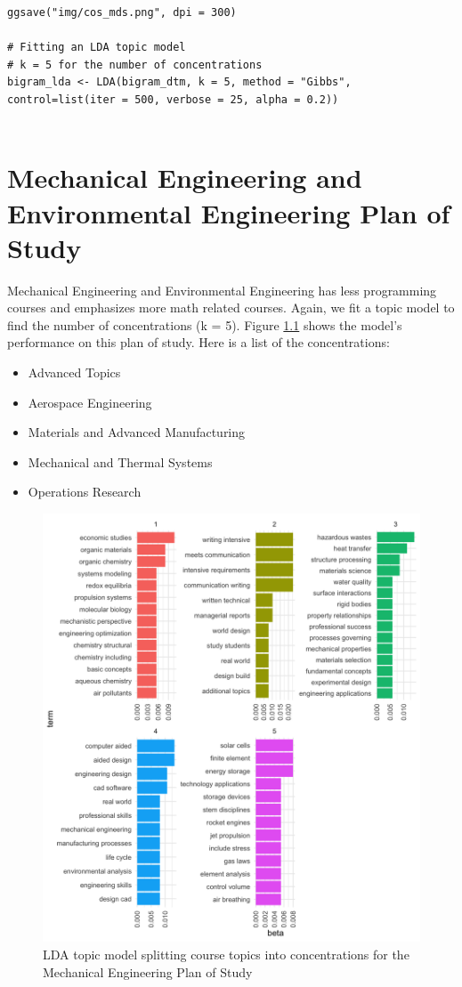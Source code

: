 \begin{appendices}
\begin{lstlisting}
ggsave("img/cos_mds.png", dpi = 300) 

# Fitting an LDA topic model
# k = 5 for the number of concentrations
bigram_lda <- LDA(bigram_dtm, k = 5, method = "Gibbs", control=list(iter = 500, verbose = 25, alpha = 0.2))
 

\end{lstlisting}

\chapter{Mechanical Engineering and Environmental Engineering Plan of Study}

Mechanical Engineering and Environmental Engineering has less programming courses and emphasizes more math related courses. Again, we fit a topic model 
to find the number of concentrations (k = 5). Figure \ref{fig:lda_me} shows the model's performance on this plan of study. Here is a list of the concentrations:

\begin{itemize}
  \item Advanced Topics
  \item Aerospace Engineering
  \item Materials and Advanced Manufacturing
  \item Mechanical and Thermal Systems
  \item Operations Research 
\end{itemize}

\begin{figure}[H]
  \centering
  
  \includegraphics[width = .8\textwidth, height = .7\textheight]{Content/images/lda_me.png}
  \caption{LDA topic model splitting course topics into concentrations for the Mechanical Engineering Plan of Study}
  \label{fig:lda_me}
\end{figure}

\end{appendices}